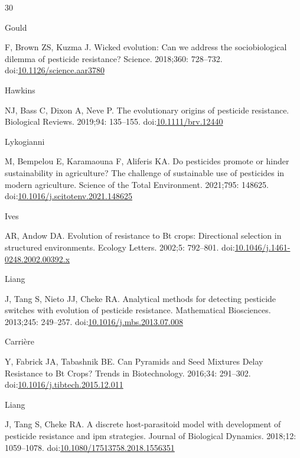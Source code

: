 \documentclass[10pt,letterpaper]{article}
\begin{document}
%
%
% 
\begin{thebibliography}{30}

\hypertarget{ref-Gould2018}{Gould} F, Brown ZS, Kuzma J. {Wicked evolution: Can we address the sociobiological dilemma of pesticide resistance?} Science. 2018;360: 728--732. doi:\href{https://doi.org/10.1126/science.aar3780}{10.1126/science.aar3780}

\hypertarget{ref-Hawkins2019}{Hawkins} NJ, Bass C, Dixon A, Neve P. {The evolutionary origins of pesticide resistance}. Biological Reviews. 2019;94: 135--155. doi:\href{https://doi.org/10.1111/brv.12440}{10.1111/brv.12440}

\hypertarget{ref-Lykogianni2021}{Lykogianni} M, Bempelou E, Karamaouna F, Aliferis KA. {Do pesticides promote or hinder sustainability in agriculture? The challenge of sustainable use of pesticides in modern agriculture}. Science of the Total Environment. 2021;795: 148625. doi:\href{https://doi.org/10.1016/j.scitotenv.2021.148625}{10.1016/j.scitotenv.2021.148625}

\hypertarget{ref-Ives2002}{Ives} AR, Andow DA. {Evolution of resistance to Bt crops: Directional selection in structured environments}. Ecology Letters. 2002;5: 792--801. doi:\href{https://doi.org/10.1046/j.1461-0248.2002.00392.x}{10.1046/j.1461-0248.2002.00392.x}

\hypertarget{ref-Liang2013}{Liang} J, Tang S, Nieto JJ, Cheke RA. {Analytical methods for detecting pesticide switches with evolution of pesticide resistance}. Mathematical Biosciences. 2013;245: 249--257. doi:\href{https://doi.org/10.1016/j.mbs.2013.07.008}{10.1016/j.mbs.2013.07.008}

\hypertarget{ref-Carriere2016}{ Carri\`{e}re} Y, Fabrick JA, Tabashnik BE. {Can Pyramids and Seed Mixtures Delay Resistance to Bt Crops?} Trends in Biotechnology. 2016;34: 291--302. doi:\href{https://doi.org/10.1016/j.tibtech.2015.12.011}{10.1016/j.tibtech.2015.12.011}

\hypertarget{ref-Liang2018}{Liang} J, Tang S, Cheke RA. {A discrete host-parasitoid model with development of pesticide resistance and ipm strategies}. Journal of Biological Dynamics. 2018;12: 1059--1078. doi:\href{https://doi.org/10.1080/17513758.2018.1556351}{10.1080/17513758.2018.1556351}


\end{thebibliography}
\end{document}
